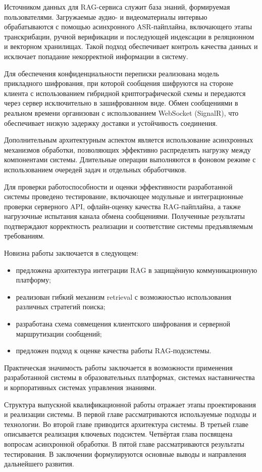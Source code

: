 \documentclass{article}
\begin{document}
Источником данных для RAG-сервиса служит база знаний, формируемая пользователями. Загружаемые аудио- и видеоматериалы интервью обрабатываются с помощью асинхронного ASR-пайплайна, включающего этапы транскрибации, ручной верификации и последующей индексации в реляционном и векторном хранилищах. Такой подход обеспечивает контроль качества данных и исключает попадание некорректной информации в систему.

Для обеспечения конфиденциальности переписки реализована модель прикладного шифрования, при которой сообщения шифруются на стороне клиента с использованием гибридной криптографической схемы и передаются через сервер исключительно в зашифрованном виде. Обмен сообщениями в реальном времени организован с использованием WebSocket (SignalR), что обеспечивает низкую задержку доставки и устойчивость соединения.

Дополнительным архитектурным аспектом является использование асинхронных механизмов обработки, позволяющих эффективно распределять нагрузку между компонентами системы. Длительные операции выполняются в фоновом режиме с использованием очередей задач и отдельных обработчиков.

Для проверки работоспособности и оценки эффективности разработанной системы проведено тестирование, включающее модульные и интеграционные проверки серверного API, офлайн-оценку качества RAG-пайплайна, а также нагрузочные испытания канала обмена сообщениями. Полученные результаты подтверждают корректность реализации и соответствие системы предъявляемым требованиям.

Новизна работы заключается в следующем:
\begin{itemize}
\item предложена архитектура интеграции RAG в защищённую коммуникационную платформу;
\item реализован гибкий механизм retrieval с возможностью использования различных стратегий поиска;
\item разработана схема совмещения клиентского шифрования и серверной маршрутизации сообщений;
\item предложен подход к оценке качества работы RAG-подсистемы.
\end{itemize}

Практическая значимость работы заключается в возможности применения разработанной системы в образовательных платформах, системах наставничества и корпоративных системах управления знаниями.

Структура выпускной квалификационной работы отражает этапы проектирования и реализации системы. В первой главе рассматриваются используемые подходы и технологии. Во второй главе приводится архитектура системы. В третьей главе описывается реализация ключевых подсистем. Четвёртая глава посвящена вопросам асинхронной обработки. В пятой главе рассматриваются результаты тестирования. В заключении формулируются основные выводы и направления дальнейшего развития.
\end{document}
